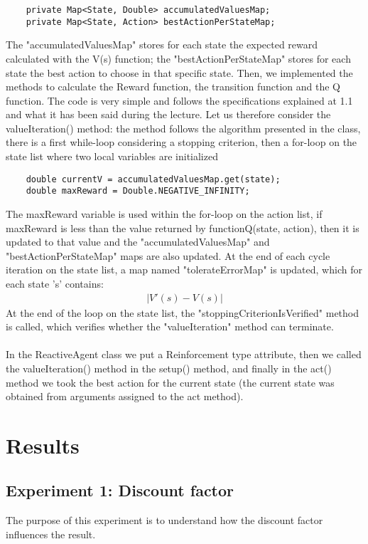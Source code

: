 \documentclass[11pt]{article}
\begin{document}
\begin{lstlisting}
	private Map<State, Double> accumulatedValuesMap;
	private Map<State, Action> bestActionPerStateMap;
\end{lstlisting}
The "accumulatedValuesMap" stores for each state the expected reward calculated with the V(s) function; the "bestActionPerStateMap" stores for each state the best action to choose in that specific state. 
Then, we implemented the methods to calculate the Reward function, the transition function and the Q function. The code is very simple and follows the specifications explained at 1.1 and what it has been said during the lecture.
Let us therefore consider the valueIteration() method: the method follows the algorithm presented in the class, there is a first while-loop considering a stopping criterion, then a for-loop on the state list where two local variables are initialized
\\
\begin{lstlisting}
	double currentV = accumulatedValuesMap.get(state);
	double maxReward = Double.NEGATIVE_INFINITY;
\end{lstlisting}
The maxReward variable is used within the for-loop on the action list, if maxReward is less than the value returned by functionQ(state, action), then it is updated to that value and the "accumulatedValuesMap" and "bestActionPerStateMap" maps are also updated. At the end of each cycle iteration on the state list, a map named  "tolerateErrorMap" is updated, which for each state 's' contains:
\begin{gather*}
| V'(s) - V(s)|
\end{gather*}
At the end of the loop on the state list, the "stoppingCriterionIsVerified" method is called, which verifies whether the "valueIteration" method can terminate.
\\
\\
In the ReactiveAgent class we put a Reinforcement type attribute, then we called the valueIteration() method in the setup() method, and finally in the act() method we took the best action for the current state (the current state was obtained from arguments assigned to the act method).


\section{Results}

\subsection{Experiment 1: Discount factor}
The purpose of this experiment is to understand how the discount factor influences the result.
\end{document}
